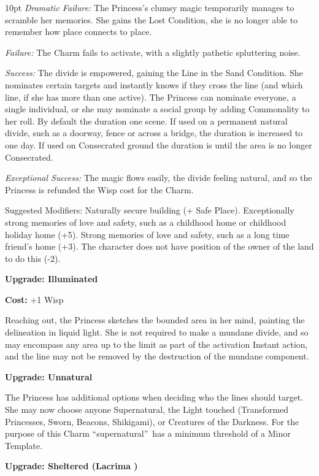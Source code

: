 \begin{myindentpar}{10pt}    \emph{Dramatic Failure:} The Princess's clumsy magic temporarily manages to scramble her memories. She gains the Lost Condition, she is no longer able to remember how place connects to place. 

    \emph{Failure:} The Charm fails to activate, with a slightly pathetic spluttering noise.

    \emph{Success:} The divide is empowered, gaining the Line in the Sand Condition. She nominates certain targets and instantly knows if they cross the line (and which line, if she has more than one active). The Princess can nominate everyone, a single individual, or she may nominate a social group by adding Commonality to her roll. By default the duration one scene. If used on a permanent natural divide, such as a doorway, fence or across a bridge, the duration is increased to one day. If used on Consecrated ground the duration is until the area is no longer Consecrated.

    \emph{Exceptional Success:} The magic flows easily, the divide feeling natural, and so the Princess is refunded the Wisp cost for the Charm.

    Suggested Modifiers: Naturally secure building (+ Safe Place). Exceptionally strong memories of love and safety, such as a childhood home or childhood holiday home (+5). Strong memories of love and safety, such as a long time friend's home (+3). The character does not have position of the owner of the land to do this (-2).

\textbf{Upgrade: Illuminated}

\noindent \textbf{Cost:} +1 Wisp

Reaching out, the Princess sketches the bounded area in her mind, painting the delineation in liquid light. She is not required to make a mundane divide, and so may encompass any area up to the limit as part of the activation Instant action, and the line may not be removed by the destruction of the mundane component. 

\textbf{Upgrade: Unnatural}

The Princess has additional options when deciding who the lines should target. She may now choose anyone Supernatural, the Light touched (Transformed Princesses, Sworn, Beacons, Shikigami), or Creatures of the Darkness. For the purpose of this Charm \textquotedblleft supernatural\textquotedblright\, has a minimum threshold of a Minor Template.

\textbf{Upgrade: Sheltered (Lacrima \textbullet)}


\end{myindentpar}
